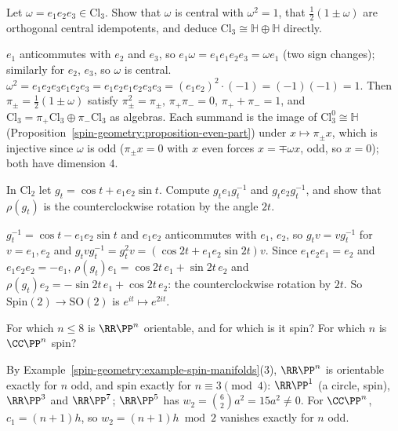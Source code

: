 \begin{exercise}\label{spin-geometry:exercise-cl-three}
Let $\omega = e_1e_2e_3 \in \mathrm{Cl}_3$. Show that $\omega$ is central with $\omega^2 = 1$, that $\frac12(1 \pm \omega)$ are orthogonal central idempotents, and deduce $\mathrm{Cl}_3 \cong \mathbb{H} \oplus \mathbb{H}$ directly.
\end{exercise}

\begin{solution}
$e_1$ anticommutes with $e_2$ and $e_3$, so $e_1\omega = e_1e_1e_2e_3 = \omega e_1$ (two sign changes); similarly for $e_2$, $e_3$, so $\omega$ is central. $\omega^2 = e_1e_2e_3e_1e_2e_3 = e_1e_2e_1e_2e_3e_3 = (e_1e_2)^2 \cdot (-1) = (-1)(-1) = 1$.
Then $\pi_\pm = \frac12(1 \pm \omega)$ satisfy $\pi_\pm^2 = \pi_\pm$, $\pi_+\pi_- = 0$, $\pi_+ + \pi_- = 1$, and $\mathrm{Cl}_3 = \pi_+\mathrm{Cl}_3 \oplus \pi_-\mathrm{Cl}_3$ as algebras. Each summand is the image of
$\mathrm{Cl}_3^0 \cong \mathbb{H}$ (Proposition~\ref{spin-geometry:proposition-even-part}) under $x \mapsto \pi_\pm x$, which is injective since $\omega$ is odd ($\pi_\pm x = 0$ with $x$ even forces $x = \mp\omega x$, odd, so $x = 0$); both have
dimension $4$.
\end{solution}

\begin{exercise}\label{spin-geometry:exercise-spin-two}
In $\mathrm{Cl}_2$ let $g_t = \cos t + e_1e_2\sin t$. Compute $g_te_1g_t^{-1}$ and $g_te_2g_t^{-1}$, and show that $\rho(g_t)$ is the counterclockwise rotation by the angle $2t$.
\end{exercise}

\begin{solution}
$g_t^{-1} = \cos t - e_1e_2\sin t$ and $e_1e_2$ anticommutes with $e_1$, $e_2$, so $g_tv = vg_t^{-1}$ for $v = e_1, e_2$ and $g_tvg_t^{-1} = g_t^2v = (\cos 2t + e_1e_2\sin 2t)v$. Since $e_1e_2e_1 = e_2$ and $e_1e_2e_2 = -e_1$,
$\rho(g_t)e_1 = \cos 2t\,e_1 + \sin 2t\,e_2$ and $\rho(g_t)e_2 = -\sin 2t\,e_1 + \cos 2t\,e_2$: the counterclockwise rotation by $2t$. So $\mathrm{Spin}(2) \to \mathrm{SO}(2)$ is $e^{it} \mapsto e^{2it}$.
\end{solution}

\begin{exercise}\label{spin-geometry:exercise-projective-spin}
For which $n \leq 8$ is $\RR\PP^n$ orientable, and for which is it spin? For which $n$ is $\CC\PP^n$ spin?
\end{exercise}

\begin{solution}
By Example~\ref{spin-geometry:example-spin-manifolds}(3), $\RR\PP^n$ is orientable exactly for $n$ odd, and spin exactly for $n \equiv 3 \pmod 4$: $\RR\PP^1$ (a circle, spin), $\RR\PP^3$ and $\RR\PP^7$; $\RR\PP^5$ has
$w_2 = \binom62a^2 = 15a^2 \neq 0$. For $\CC\PP^n$, $c_1 = (n + 1)h$, so $w_2 = (n + 1)h \bmod 2$ vanishes exactly for $n$ odd.
\end{solution}

